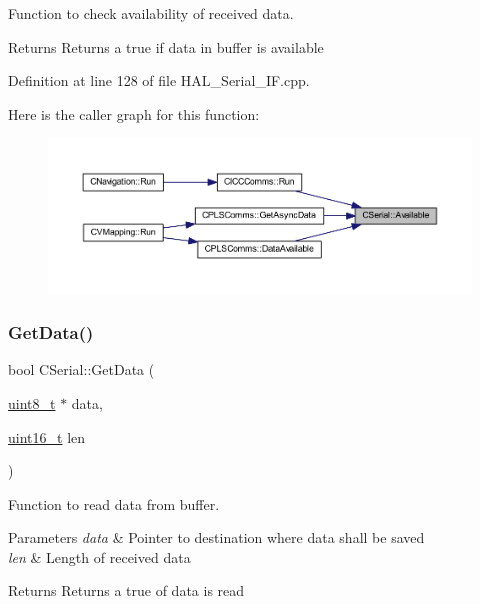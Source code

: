 Function to check availability of received data. 

\begin{DoxyReturn}{Returns}
Returns a true if data in buffer is available 
\end{DoxyReturn}


Definition at line 128 of file H\+A\+L\+\_\+\+Serial\+\_\+\+I\+F.\+cpp.

Here is the caller graph for this function\+:
\nopagebreak
\begin{figure}[H]
\begin{center}
\leavevmode
\includegraphics[width=350pt]{class_c_serial_abb43734223d937a86e7616636ea16024_icgraph}
\end{center}
\end{figure}
\mbox{\label{class_c_serial_abad86c07f530569b2ceeea75bda485ad}} 
\subsubsection{\texorpdfstring{GetData()}{GetData()}}
{\footnotesize\ttfamily bool C\+Serial\+::\+Get\+Data (\begin{DoxyParamCaption}\item[{\mbox{\hyperlink{_a_d_a_s___types_8h_aba7bc1797add20fe3efdf37ced1182c5}{uint8\+\_\+t}} $\ast$}]{data,  }\item[{\mbox{\hyperlink{_a_d_a_s___types_8h_a1f1825b69244eb3ad2c7165ddc99c956}{uint16\+\_\+t}}}]{len }\end{DoxyParamCaption})}



Function to read data from buffer. 


\begin{DoxyParams}{Parameters}
{\em data} & Pointer to destination where data shall be saved \\
\hline
{\em len} & Length of received data \\
\hline
\end{DoxyParams}
\begin{DoxyReturn}{Returns}
Returns a true of data is read 
\end{DoxyReturn}


